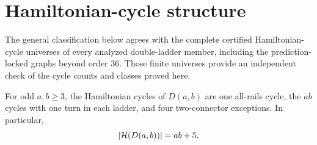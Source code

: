 \section{Hamiltonian-cycle structure}
\label{sec:hamiltonian-cycles}

The general classification below agrees with the complete certified
Hamiltonian-cycle universes of every analyzed double-ladder member, including
the prediction-locked graphs beyond order 36.  Those finite universes provide
an independent check of the cycle counts and classes proved here.

\begin{theorem}
\label{thm:cycle-formula}
For odd \(a,b\ge3\), the Hamiltonian cycles of \(D(a,b)\) are one all-rails
cycle, the \(ab\) cycles with one turn in each ladder, and four two-connector
exceptions.  In particular,
\[
 |\mathcal{H}(D(a,b))|=ab+5.
\]
\end{theorem}

